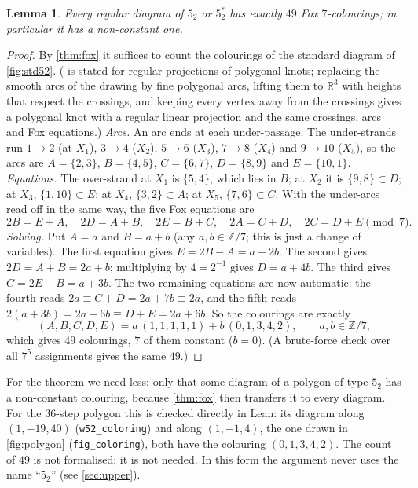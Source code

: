 \documentclass[11pt]{article}
\theoremstyle{plain}
\newtheorem{lemma}[theorem]{Lemma}
\theoremstyle{definition}
\theoremstyle{remark}
\newcommand{\Z}{\mathbb{Z}}
\newcommand{\R}{\mathbb{R}}
\newcommand{\lean}[1]{\texttt{#1}}
\begin{document}
\begin{lemma}\label{lem:fiftytwo}
Every regular diagram of $5_2$ or $5_2^*$ has exactly $49$ Fox $7$-colourings; in particular it has a
non-constant one.
\end{lemma}
\begin{proof}
By \cref{thm:fox} it suffices to count the colourings of the standard diagram of \cref{fig:std52}.
( is stated for regular projections of polygonal knots; replacing the smooth arcs of the
drawing by fine polygonal arcs, lifting them to $\R^3$ with heights that respect the crossings, and
keeping every vertex away from the crossings gives a polygonal knot with a regular linear projection
and the same crossings, arcs and Fox equations.)
\emph{Arcs.} An arc ends at each under-passage. The under-strands run $1\to2$ (at $X_1$), $3\to4$ ($X_2$),
$5\to6$ ($X_3$), $7\to8$ ($X_4$) and $9\to10$ ($X_5$), so the arcs are $A=\{2,3\}$, $B=\{4,5\}$,
$C=\{6,7\}$, $D=\{8,9\}$ and $E=\{10,1\}$. \emph{Equations.} The over-strand at $X_1$ is $\{5,4\}$, which
lies in $B$; at $X_2$ it is $\{9,8\}\subset D$; at $X_3$, $\{1,10\}\subset E$; at $X_4$,
$\{3,2\}\subset A$; at $X_5$, $\{7,6\}\subset C$. With the under-arcs read off in the same way, the five
Fox equations are
\[ 2B=E+A,\quad 2D=A+B,\quad 2E=B+C,\quad 2A=C+D,\quad 2C=D+E \pmod 7. \]
\emph{Solving.} Put $A=a$ and $B=a+b$ (any $a,b\in\Z/7$; this is just a change of variables). The first
equation gives $E=2B-A=a+2b$. The second gives $2D=A+B=2a+b$; multiplying by $4=2^{-1}$ gives
$D=a+4b$. The third gives $C=2E-B=a+3b$. The two remaining equations are now automatic: the fourth
reads $2a\equiv C+D=2a+7b\equiv2a$, and the fifth reads $2(a+3b)=2a+6b\equiv D+E=2a+6b$. So the
colourings are exactly
\[ (A,B,C,D,E)=a\,(1,1,1,1,1)+b\,(0,1,3,4,2),\qquad a,b\in\Z/7, \]
which gives $49$ colourings, $7$ of them constant ($b=0$). (A brute-force check over all $7^5$
assignments gives the same $49$.)
\end{proof}

For the theorem we need less: only that some diagram of a polygon of type $5_2$ has a non-constant
colouring, because \cref{thm:fox} then transfers it to every diagram. For the 36-step polygon this is
checked directly in Lean: its diagram along $(1,-19,40)$ (\lean{w52\_coloring}) and along $(1,-1,4)$,
the one drawn in \cref{fig:polygon} (\lean{fig\_coloring}), both have the colouring $(0,1,3,4,2)$. The
count of $49$ is not formalised; it is not needed. In this form the argument never uses the name ``$5_2$'' (see \cref{sec:upper}).
\end{document}
